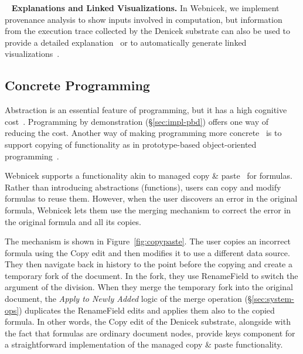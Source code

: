 \documentclass[sigconf,anonymous,screen]{acmart}
\newcommand{\ident}[1]{{\sffamily #1}}
\DeclareRobustCommand{\keyideabox}[3]{\begin{tcolorbox}[breakable,
  boxsep=5pt,left=0pt,right=0pt,top=0pt,bottom=0pt,width=\dimexpr\columnwidth\relax,
  colback=gray!20,colframe=gray!20,
  enlarge bottom by=0pt,enlarge top by=0pt,
  arc=0pt,outer arc=0pt]
\lettrine[lraise=0.3]{\LARGE #1}{~}
\small \textbf{#2.} #3
\end{tcolorbox}
}
\begin{document}
\keyideabox{\faBarChart}{Explanations and Linked Visualizations}{In Webnicek, we implement
provenance analysis to show inputs involved in computation, but information from the execution
trace collected by the Denicek substrate can also be used to provide a detailed
explanation~\cite{perera-2012-functional} or to automatically generate linked visualizations~\cite{perera-2022-linked}.}


\subsection{Concrete Programming}
\label{sec:impl-copy}

Abstraction is an essential feature of programming, but it has a high cognitive
cost~\cite{blackwell-2002-attention}. Programming by demonstration (\S\ref{sec:impl-pbd})
offers one way of reducing the cost. Another way of making programming more
concrete~\cite{edwards-2004-example,smith-1975-pygmalion} is to support copying of functionality
as in prototype-based object-oriented programming~\cite{randall-1995-self}.

Webnicek supports a functionality akin to managed copy \&
paste~\cite{edwards-2006-copypaste,edwards-2022-copypaste} for formulas. Rather than introducing
abstractions (functions), users can copy and modify formulas to reuse them. However, when the user
discovers an error in the original formula, Webnicek lets them use the merging mechanism to correct
the error in the original formula and all its copies.

The mechanism is shown in Figure~\ref{fig:copypaste}. The user copies an incorrect formula using
the \ident{Copy} edit and then modifies it to use a different data source. They then navigate back
in history to the point before the copying and create a temporary fork of the document. In the
fork, they use \ident{RenameField} to switch the argument of the division. When they merge the
temporary fork into the original document, the \emph{Apply to Newly Added} logic of the merge
operation (\S\ref{sec:system-ops}) duplicates the \ident{RenameField} edits and applies them also
to the copied formula. In other words, the \ident{Copy} edit of the Denicek substrate, alongside
with the fact that formulas are ordinary document nodes, provide keys component for a
straightforward implementation of the managed copy \& paste functionality.
\end{document}
